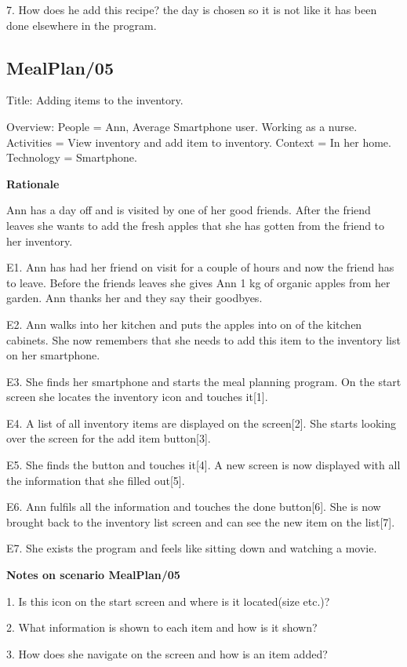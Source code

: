 7. How does he add this recipe? the day is chosen so it is not like it has been done elsewhere in the program.

\subsection{MealPlan/05} \label{MealPlan05}

Title: Adding items to the inventory.

Overview:
	People = Ann, Average Smartphone user. Working as a nurse.
	Activities = View inventory and add item to inventory.
	Context = In her home.
	Technology = Smartphone.

\textbf{Rationale}

Ann has a day off and is visited by one of her good friends. After the friend leaves she wants to add the fresh apples that she has gotten from the friend to her inventory.

	E1. Ann has had her friend on visit for a couple of hours and now the friend has to leave. Before the friends leaves she gives Ann 1 kg of organic apples from her garden. Ann thanks her and they say their goodbyes.

	E2. Ann walks into her kitchen and puts the apples into on of the kitchen cabinets. She now remembers that she needs to add this item to the inventory list on her smartphone.

	E3. She finds her smartphone and starts the meal planning program. On the start screen she locates the inventory icon and touches it[1].

	E4. A list of all inventory items are displayed on the screen[2]. She starts looking over the screen for the add item button[3].

	E5. She finds the button and touches it[4]. A new screen is now displayed with all the information that she filled out[5]. 

	E6. Ann fulfils all the information and touches the done button[6]. She is now brought back to the inventory list screen and can see the new item on the list[7].

	E7. She exists the program and feels like sitting down and watching a movie.

\textbf{Notes on scenario MealPlan/05}

1. Is this icon on the start screen and where is it located(size etc.)?

2. What information is shown to each item and how is it shown?

3. How does she navigate on the screen and how is an item added?

